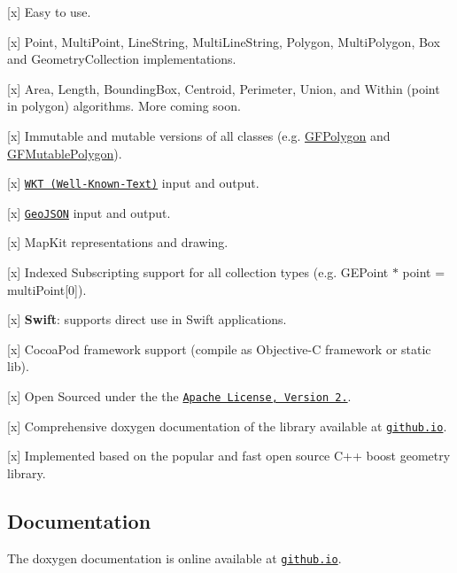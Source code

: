 \begin{DoxyItemize}
\item \mbox{[}x\mbox{]} Easy to use.
\item \mbox{[}x\mbox{]} Point, Multi\+Point, Line\+String, Multi\+Line\+String, Polygon, Multi\+Polygon, Box and Geometry\+Collection implementations.
\item \mbox{[}x\mbox{]} Area, Length, Bounding\+Box, Centroid, Perimeter, Union, and Within (point in polygon) algorithms. More coming soon.
\item \mbox{[}x\mbox{]} Immutable and mutable versions of all classes (e.\+g. {\ttfamily \hyperlink{interface_g_f_polygon}{G\+F\+Polygon}} and {\ttfamily \hyperlink{interface_g_f_mutable_polygon}{G\+F\+Mutable\+Polygon}}).
\item \mbox{[}x\mbox{]} \href{https://en.wikipedia.org/wiki/Well-known_text}{\tt W\+K\+T (Well-\/\+Known-\/\+Text)} input and output.
\item \mbox{[}x\mbox{]} \href{http://geojson.org/}{\tt Geo\+J\+S\+O\+N} input and output.
\item \mbox{[}x\mbox{]} Map\+Kit representations and drawing.
\item \mbox{[}x\mbox{]} Indexed Subscripting support for all collection types (e.\+g. {\ttfamily G\+E\+Point $\ast$ point = multi\+Point\mbox{[}0\mbox{]}}).
\item \mbox{[}x\mbox{]} {\bfseries Swift}\+: supports direct use in Swift applications.
\item \mbox{[}x\mbox{]} Cocoa\+Pod framework support (compile as Objective-\/\+C framework or static lib).
\item \mbox{[}x\mbox{]} Open Sourced under the the \href{http://www.apache.org/licenses/LICENSE-2.0.html}{\tt Apache License, Version 2.}.
\item \mbox{[}x\mbox{]} Comprehensive doxygen documentation of the library available at \href{http://tonystone.github.io/geofeatures}{\tt github.\+io}.
\item \mbox{[}x\mbox{]} Implemented based on the popular and fast open source C++ boost geometry library.
\end{DoxyItemize}

\subsection*{Documentation}

The doxygen documentation is online available at \href{http://tonystone.github.io/geofeatures}{\tt github.\+io}.

